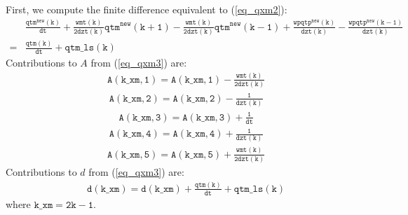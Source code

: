 \documentclass[11pt,fleqn]{article}
\begin{document}
First, we compute
the finite difference equivalent to (\ref{eq_qxm2}):
%
\begin{equation}
\label{eq_qxm3}
\begin{split}
& \mathtt{
   \frac{qtm^{new}(k)}{dt}
   + \frac{wmt(k)}{2dzt(k)} qtm^{new}(k+1)
   - \frac{wmt(k)}{2dzt(k)} qtm^{new}(k-1)
   + \frac{wpqtp^{new}(k)}{dzt(k)}
   - \frac{wpqtp^{new}(k-1)}{dzt(k)} } \\
=& \mathtt{
   \frac{qtm(k)}{dt} + qtm\_ls(k)
  }
\end{split}
\end{equation}
%
Contributions to $A$ from (\ref{eq_qxm3}) are:
%
\begin{equation}
\begin{split}
& \mathtt{
  A(k\_xm,1) = A(k\_xm,1) - \frac{wmt(k)}{2dzt(k)}
  }
\end{split}
\end{equation}
%
\begin{equation}
\begin{split}
& \mathtt{
  A(k\_xm,2) = A(k\_xm,2) - \frac{1}{dzt(k)}
  }
\end{split}
\end{equation}
%
\begin{equation}
\begin{split}
& \mathtt{
  A(k\_xm,3) = A(k\_xm,3) + \frac{1}{dt}
  }
\end{split}
\end{equation}
%
\begin{equation}
\begin{split}
& \mathtt{
  A(k\_xm,4) = A(k\_xm,4) + \frac{1}{dzt(k)}
  }
\end{split}
\end{equation}
%
\begin{equation}
\begin{split}
& \mathtt{
  A(k\_xm,5) = A(k\_xm,5) + \frac{wmt(k)}{2dzt(k)}
  }
\end{split}
\end{equation}
%
Contributions to $d$ from (\ref{eq_qxm3}) are:
%
\begin{equation}
\begin{split}
& \mathtt{
  d(k\_xm) = d(k\_xm) + \frac{qtm(k)}{dt} + qtm\_ls(k)
  }
\end{split}
\end{equation}
%
where $\mathtt{k\_xm = 2 k - 1}$.
\end{document}

